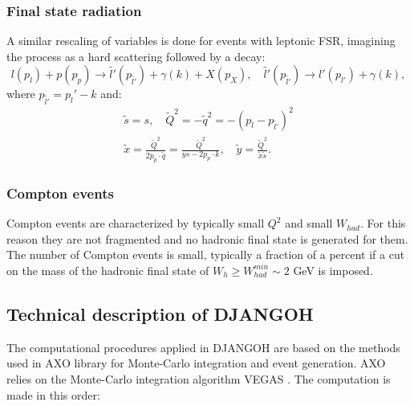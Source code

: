 \subsubsection*{Final state radiation}

A similar rescaling of variables is done for events with leptonic FSR, imagining the process as a hard scattering followed by a decay:
%
\begin{equation}
   l(p_{l}) + p(p_p) \rightarrow \widetilde{l'}(p_{\widetilde{l'}}) + \gamma(k) + X(p_X),\quad \widetilde{l'}(p_{\widetilde{l'}}) \rightarrow l'(p_{l'}) + \gamma(k),
\end{equation}
%
where $p_{\widetilde{l'}} = p_l' - k$ and:
%
\begin{equation}
  \begin{split}
    \widetilde{s} = s,\quad \widetilde{Q}^2 = -\widetilde{q}^2 = -(p_l-p_{\widetilde{l'}})^2 \\
    \widetilde{x} = \frac{\widetilde{Q}^2}{2p_p \cdot \widetilde{q}} = \frac{\widetilde{Q}^2}{ys-2p_p \cdot k},\quad \widetilde{y} = \frac{\widetilde{Q}^2}{\widetilde{x}\widetilde{s}}.
  \end{split}
\end{equation}
%

\subsubsection*{Compton events}

Compton events are characterized by typically small $Q^2$ and small $W_{had}$. For this reason they are not fragmented and no hadronic final state is generated for them. The number of Compton events is small, typically a fraction of a percent if a cut on the mass of the hadronic final state of $W_h \geq W_{had}^{min} \sim 2$ GeV is imposed.


\subsection{Technical description of DJANGOH}

The computational procedures applied in DJANGOH are based on the methods used in AXO \cite{AXO} library for Monte-Carlo integration and event generation. AXO relies on the Monte-Carlo integration algorithm VEGAS \cite{VEGAS}. The computation is made in this order:

